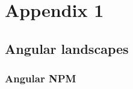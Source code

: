
\chapter{Appendix 1} %

\label{appendix1} %


\section{Angular landscapes}

\subsection{Angular NPM}


